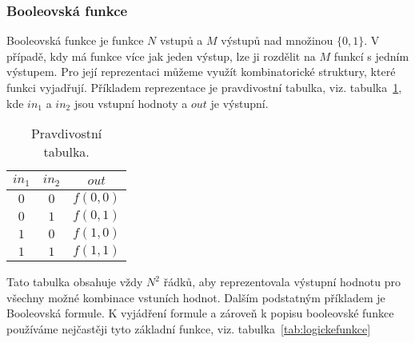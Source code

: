 \documentclass{report}
\begin{document}
\subsubsection{Booleovská funkce}
Booleovská funkce je funkce $N$ vstupů a $M$ výstupů nad množinou $\{0, 1\}$. V případě, kdy má funkce více jak jeden výstup, lze ji rozdělit na $M$ funkcí s jedním výstupem. Pro její reprezentaci můžeme využít kombinatorické struktury, které funkci vyjadřují. Příkladem reprezentace je pravdivostní tabulka, viz. tabulka~\ref{tab:andtable}, kde $in_1$ a $in_2$ jsou vstupní hodnoty a $out$ je výstupní.
\begin{table}[!htbp]
\centering
\begin{tabular}{ |c|c|c| } 
   	\hline
	$in_1$ & $in_2$ & $out$ \\
   	\hline
	$0$ & $0$ & $f(0,0)$ \\
   	\hline
	$0$ & $1$ & $f(0,1)$ \\
   	\hline
	$1$ & $0$ & $f(1,0)$ \\
   	\hline
	$1$ & $1$ & $f(1,1)$ \\
   	\hline
\end{tabular}
    \caption{Pravdivostní tabulka.}
    \label{tab:andtable}
\end{table}
Tato tabulka obsahuje vždy $N^2$ řádků, aby reprezentovala výstupní hodnotu pro všechny možné kombinace vstuních hodnot. Dalším podstatným příkladem je Booleovská formule. K vyjádření formule a zároveň k popisu booleovské funkce používáme nejčastěji tyto základní funkce, viz. tabulka~\ref{tab:logickefunkce}
\end{document}
